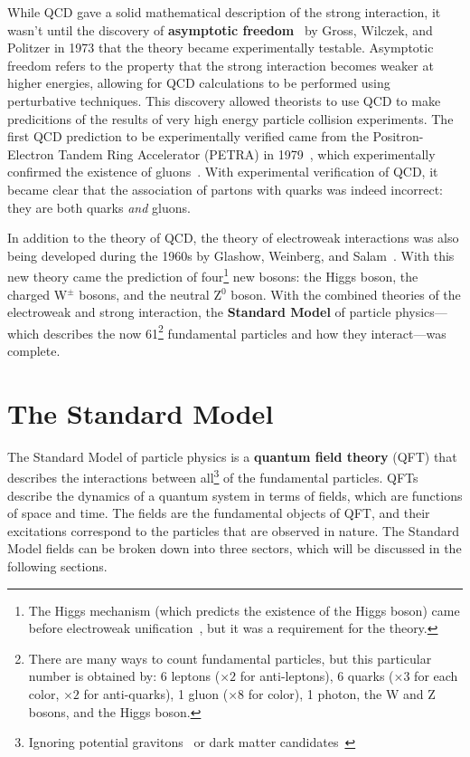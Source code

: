 While QCD gave a solid mathematical description of the strong interaction, it wasn't until the discovery of \textbf{asymptotic freedom}~\cite{AssFreedom1, AssFreedom2} by Gross, Wilczek, and Politzer in 1973 that the theory became experimentally testable. Asymptotic freedom refers to the property that the strong interaction becomes weaker at higher energies, allowing for QCD calculations to be performed using perturbative techniques. This discovery allowed theorists to use QCD to make predicitions of the results of very high energy particle collision experiments. The first QCD prediction to be experimentally verified came from the Positron-Electron Tandem Ring Accelerator (PETRA) in 1979~\cite{PETRA}, which experimentally confirmed the existence of gluons~\cite{GluonConfirmation}. With experimental verification of QCD, it became clear that the association of partons with quarks was indeed incorrect: they are both quarks \textit{and} gluons.

In addition to the theory of QCD, the theory of electroweak interactions was also being developed during the 1960s by Glashow, Weinberg, and Salam~\cite{Electroweak1, Electroweak2}. With this new theory came the prediction of four\footnote{The Higgs mechanism (which predicts the existence of the Higgs boson) came before electroweak unification~\cite{HiggsPaper}, but it was a requirement for the theory.} new bosons: the Higgs boson, the charged W$^{\pm}$ bosons, and the neutral Z$^{0}$ boson. With the combined theories of the electroweak and strong interaction, the \textbf{Standard Model} of particle physics---which describes the now 61\footnote{There are many ways to count fundamental particles, but this particular number is obtained by: 6 leptons ($\times 2$ for anti-leptons), 6 quarks ($\times 3$ for each color, $\times 2$ for anti-quarks), 1 gluon ($\times 8$ for color), 1 photon, the W and Z bosons, and the Higgs boson.} fundamental particles and how they interact---was complete. 


\section{The Standard Model}
\label{sec:standard_model}

The Standard Model of particle physics is a \textbf{quantum field theory} (QFT) that describes the interactions between all\footnote{Ignoring potential gravitons~\cite{Graviton} or dark matter candidates~\cite{DarkMatter1}} of the fundamental particles. QFTs describe the dynamics of a quantum system in terms of fields, which are functions of space and time. The fields are the fundamental objects of QFT, and their excitations correspond to the particles that are observed in nature. The Standard Model fields can be broken down into three sectors, which will be discussed in the following sections.

